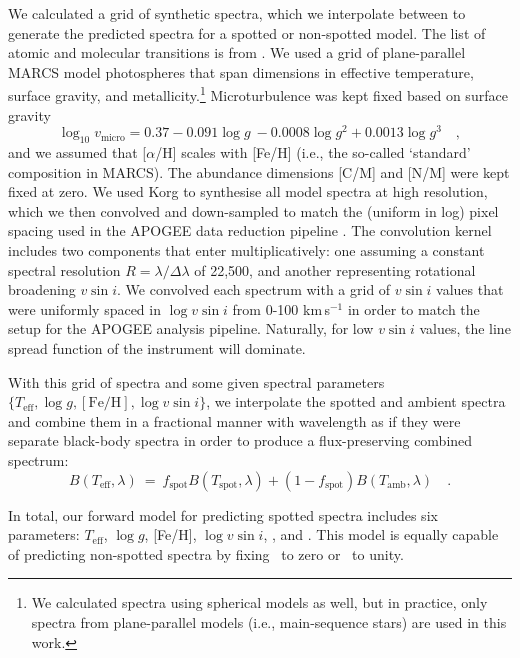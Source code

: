 We calculated a grid of synthetic spectra, which we interpolate between to generate the predicted spectra for a spotted or non-spotted model. The list of atomic and molecular transitions is from \citep{shetrone_sdss-iii_2015, smith_apogee_2021}. We used a grid of plane-parallel MARCS \citep{gustafsson_grid_2008} model photospheres that span dimensions in effective temperature, surface gravity, and metallicity.\footnote{We calculated spectra using spherical models as well, but in practice, only spectra from plane-parallel models (i.e., main-sequence stars) are used in this work.} Microturbulence was kept fixed based on surface gravity \citep{holtzman_apogee_2018}
\begin{equation}
\label{eq:vmic}
    \log_{10}{v_{\text{micro}}} = 0.37 - 0.091 \log{g}\ - 0.0008 \log{g} ^2 + 0.0013 \log{g} ^3 \quad ,
\end{equation}
and we assumed that [$\alpha$/H] scales with [Fe/H] (i.e., the so-called `standard' composition in MARCS). The abundance dimensions [C/M] and [N/M] were kept fixed at zero. We used Korg \citep{wheeler_korg_2022} to synthesise all model spectra at high resolution, which we then convolved and down-sampled to match the (uniform in log) pixel spacing used in the APOGEE data reduction pipeline \citep{holtzman_apogee_2018}. The convolution kernel includes two components that enter multiplicatively: one assuming a constant spectral resolution $R = \lambda/\Delta\lambda$ of 22,500, and another representing rotational broadening $v\sin{i}$. We convolved each spectrum with a grid of $v\sin{i}$ values that were uniformly spaced in $\log{v\sin{i}}$ from 0-100 km\,s$^{-1}$ in order to match the setup for the APOGEE analysis pipeline. Naturally, for low $v\sin{i}$ values, the line spread function of the instrument will dominate.

With this grid of spectra and some given spectral parameters $\{T_\mathrm{eff},\log{g},[\mathrm{Fe/H}],\log{v\sin{i}}\}$, we interpolate the spotted and ambient spectra and combine them in a fractional manner with wavelength as if they were separate black-body spectra in order to produce a flux-preserving combined spectrum:
\begin{equation}
    B(T_{\text{eff}} , \lambda) \ = \ f_{\text{spot}}B(T_{\text{spot}}, \lambda) + (1 - f_{\text{spot}}) B(T_{\text{amb}}, \lambda) \quad .
\end{equation}

In total, our forward model for predicting spotted spectra includes six parameters: $T_\mathrm{eff}$, $\log{g}$, [Fe/H], $\log{v\sin{i}}$, \xspot, and \fspot. This model is equally capable of predicting non-spotted spectra by fixing \fspot\ to zero or \xspot\ to unity.


